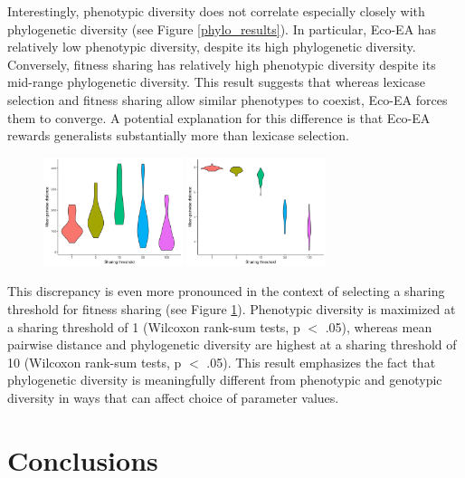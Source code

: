 Interestingly, phenotypic diversity does not correlate especially closely with phylogenetic diversity (see Figure \ref{phylo_results}). In particular, Eco-EA has relatively low phenotypic diversity, despite its high phylogenetic diversity. Conversely, fitness sharing has relatively high phenotypic diversity despite its mid-range phylogenetic diversity. This result suggests that whereas lexicase selection and fitness sharing allow similar phenotypes to coexist, Eco-EA forces them to converge. A potential explanation for this difference is that Eco-EA rewards generalists substantially more than lexicase selection.

\begin{figure}
\includegraphics[width=1.6in]{figs/sharing_pairwise_dist.png}
\includegraphics[width=1.6in]{figs/sharing_phenotypic_entropy.png}
\caption{}
\label{sharing}
\end{figure}

This discrepancy is even more pronounced in the context of selecting a sharing threshold for fitness sharing (see Figure \ref{sharing}). Phenotypic diversity is maximized at a sharing threshold of 1  (Wilcoxon rank-sum tests, p $<$ .05), whereas mean pairwise distance and phylogenetic diversity are highest at a sharing threshold of 10 (Wilcoxon rank-sum tests, p $<$ .05). This result emphasizes the fact that phylogenetic diversity is meaningfully different from phenotypic and genotypic diversity in ways that can affect choice of parameter values.

\section{Conclusions}


